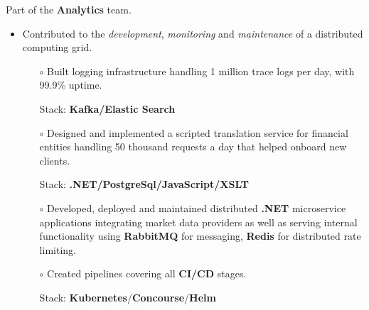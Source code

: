 \documentclass[11pt,a4paper]{altacv}
\begin{document}

%

\begin{fullwidth}
    \makecvheader
\end{fullwidth}

%
\bigskip



\medskip

    Part of the {\bf Analytics} team. \medskip

    \begin{itemize}
        \setlength\itemsep{1em}
    \item {Contributed to the {\it development}, {\it monitoring} and {\it maintenance} of a distributed computing grid.} \\
          \smallskip
          \begin{itemize}
              
              \item[$\circ$] Built logging infrastructure handling 1 million trace logs per day, with 99.9\% uptime. 
              
              Stack: {\bf Kafka/Elastic Search}
              
              \item[$\circ$] Designed and implemented a scripted translation service for financial entities handling 50 thousand requests a day that helped onboard new clients.
              
              Stack: {\bf .NET/PostgreSql/JavaScript/XSLT}

              \item[$\circ$] Developed, deployed and maintained distributed {\bf.NET} microservice applications integrating market data providers as well as serving internal functionality using {\bf RabbitMQ} for messaging, {\bf Redis} for distributed rate limiting.
              
              \item[$\circ$] Created pipelines covering all {\bf CI/CD} stages.
              
              Stack: {\bf Kubernetes}/{\bf Concourse}/{\bf Helm}
                        
          \end{itemize}

\end{itemize}
\end{document}
